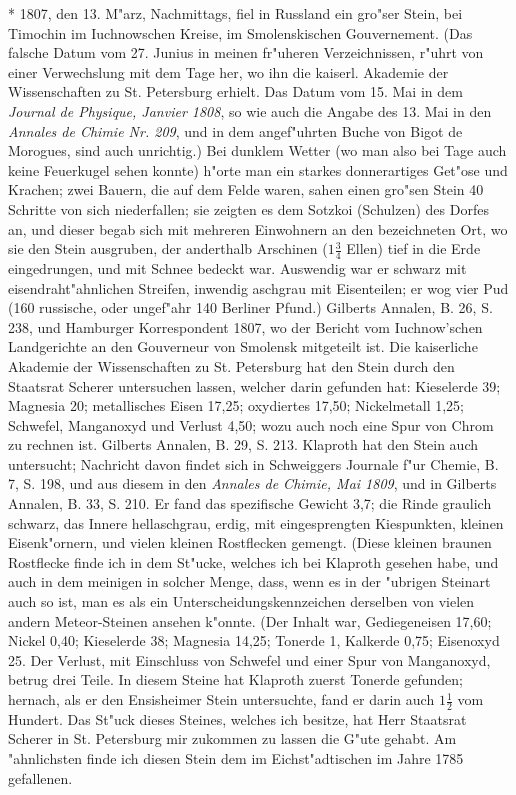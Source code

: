 \documentclass[a4paper, 11pt, oneside, polutonikogreek, german]{article}
\begin{document}
* 1807, den 13. M"arz, Nachmittags, fiel in Russland ein gro"ser Stein, bei Timochin im Iuchnowschen Kreise, im Smolenskischen Gouvernement. (Das falsche Datum vom 27. Junius in meinen fr"uheren Verzeichnissen, r"uhrt von einer Verwechslung mit dem Tage her, wo ihn die kaiserl. Akademie der Wissenschaften zu St. Petersburg erhielt. Das Datum vom 15. Mai in dem \emph{Journal de Physique, Janvier 1808}, so wie auch die Angabe des 13. Mai in den \emph{Annales de Chimie Nr. 209}, und in dem angef"uhrten Buche von Bigot de Morogues, sind auch unrichtig.) Bei dunklem Wetter (wo man also bei Tage auch keine Feuerkugel sehen konnte) h"orte man ein starkes donnerartiges Get"ose und Krachen; zwei Bauern, die auf dem Felde waren, sahen einen gro"sen Stein 40 Schritte von sich niederfallen; sie zeigten es dem Sotzkoi (Schulzen) des Dorfes an, und dieser begab sich mit mehreren Einwohnern an den bezeichneten Ort, wo sie den Stein ausgruben, der anderthalb Arschinen ($\mathfrak{1\frac{3}{4}}$ Ellen) tief in die Erde eingedrungen, und mit Schnee bedeckt war. Auswendig war er schwarz mit eisendraht"ahnlichen Streifen, inwendig aschgrau mit Eisenteilen; er wog vier Pud (160 russische, oder ungef"ahr 140 Berliner Pfund.) Gilberts Annalen, B. 26, S. 238, und Hamburger Korrespondent 1807, wo der Bericht vom Iuchnow'schen Landgerichte an den Gouverneur von Smolensk mitgeteilt ist. Die kaiserliche Akademie der Wissenschaften zu St. Petersburg hat den Stein durch den Staatsrat Scherer untersuchen lassen, welcher darin gefunden hat: Kieselerde 39; Magnesia 20; metallisches Eisen 17,25; oxydiertes 17,50; Nickelmetall 1,25; Schwefel, Manganoxyd und Verlust 4,50; wozu auch noch eine Spur von Chrom zu rechnen ist. Gilberts Annalen, B. 29, S. 213. Klaproth hat den Stein auch untersucht; Nachricht davon findet sich in Schweiggers Journale f"ur Chemie, B. 7, S. 198, und aus diesem in den \emph{Annales de Chimie, Mai 1809}, und in Gilberts Annalen, B. 33, S. 210. Er fand das spezifische Gewicht 3,7; die Rinde graulich schwarz, das Innere hellaschgrau, erdig, mit eingesprengten Kiespunkten, kleinen Eisenk"ornern, und vielen kleinen Rostflecken gemengt. (Diese kleinen braunen Rostflecke finde ich in dem St"ucke, welches ich bei Klaproth gesehen habe, und auch in dem meinigen in solcher Menge, dass, wenn es in der "ubrigen Steinart auch so ist, man es als ein Unterscheidungskennzeichen derselben von vielen andern Meteor-Steinen ansehen k"onnte. (Der Inhalt war, Gediegeneisen 17,60; Nickel 0,40; Kieselerde 38; Magnesia 14,25; Tonerde 1, Kalkerde 0,75; Eisenoxyd 25. Der Verlust, mit Einschluss von Schwefel und einer Spur von Manganoxyd, betrug drei Teile. In diesem Steine hat Klaproth zuerst Tonerde gefunden; hernach, als er den Ensisheimer Stein untersuchte, fand er darin auch $\mathfrak{1\frac{1}{2}}$ vom Hundert. Das St"uck dieses Steines, welches ich besitze, hat Herr Staatsrat Scherer in St. Petersburg mir zukommen zu lassen die G"ute gehabt. Am "ahnlichsten finde ich diesen Stein dem im Eichst"adtischen im Jahre 1785 gefallenen.
\end{document}
